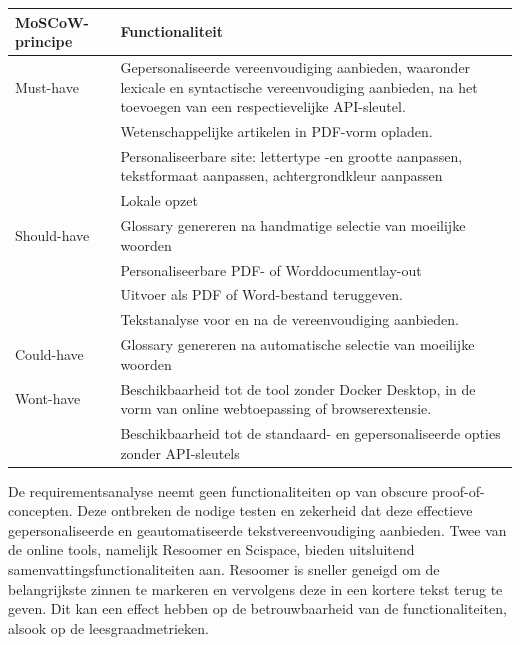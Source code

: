 \begin{center}
	\begin{tabular}{ | m{4cm} | m{12cm} | } 
		\hline
		\textbf{MoSCoW-principe} & Functionaliteit \\
		\hline
		Must-have & Gepersonaliseerde vereenvoudiging aanbieden, waaronder lexicale en syntactische vereenvoudiging aanbieden, na het toevoegen van een respectievelijke API-sleutel. \\
		& Wetenschappelijke artikelen in PDF-vorm opladen. \\
		& Personaliseerbare site: lettertype -en grootte aanpassen, tekstformaat aanpassen, achtergrondkleur aanpassen \\
		& Lokale opzet \\
		\hline
		Should-have & Glossary genereren na handmatige selectie van moeilijke woorden \\
		& Personaliseerbare PDF- of Worddocumentlay-out \\
		& Uitvoer als PDF of Word-bestand teruggeven. \\
		& Tekstanalyse voor en na de vereenvoudiging aanbieden. \\
		\hline
		Could-have & Glossary genereren na automatische selectie van moeilijke woorden \\
		\hline
		Wont-have & Beschikbaarheid tot de tool zonder Docker Desktop, in de vorm van online webtoepassing of browserextensie. \\
		& Beschikbaarheid tot de standaard- en gepersonaliseerde opties zonder API-sleutels \\
		\hline
	\end{tabular}
\end{center}


De requirementsanalyse neemt geen functionaliteiten op van obscure proof-of-concepten. Deze ontbreken de nodige testen en zekerheid dat deze effectieve gepersonaliseerde en geautomatiseerde tekstvereenvoudiging aanbieden. Twee van de online tools, namelijk Resoomer en Scispace, bieden uitsluitend samenvattingsfunctionaliteiten aan. Resoomer is sneller geneigd om de belangrijkste zinnen te markeren en vervolgens deze in een kortere tekst terug te geven. Dit kan een effect hebben op de betrouwbaarheid van de functionaliteiten, alsook op de leesgraadmetrieken.



